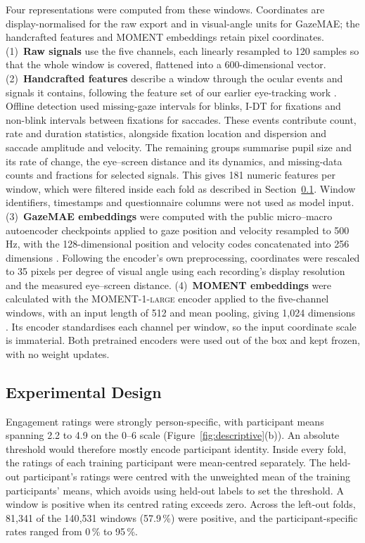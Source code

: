 Four representations were computed from these windows.
Coordinates are display-normalised for the raw export and in visual-angle units for GazeMAE; the handcrafted features and MOMENT embeddings retain pixel coordinates.
(1)~\textbf{Raw signals} use the five channels, each linearly resampled to 120 samples so that the whole window is covered, flattened into a 600-dimensional vector.
(2)~\textbf{Handcrafted features} describe a window through the ocular events and signals it contains, following the feature set of our earlier eye-tracking work \cite{bozak2026workload,bozak2024emotion}.
Offline detection used missing-gaze intervals for blinks, I-DT for fixations and non-blink intervals between fixations for saccades.
These events contribute count, rate and duration statistics, alongside fixation location and dispersion and saccade amplitude and velocity.
The remaining groups summarise pupil size and its rate of change, the eye--screen distance and its dynamics, and missing-data counts and fractions for selected signals.
This gives 181 numeric features per window, which were filtered inside each fold as described in Section~\ref{subsec:design}.
Window identifiers, timestamps and questionnaire columns were not used as model input.
(3)~\textbf{GazeMAE embeddings} were computed with the public micro--macro autoencoder checkpoints applied to gaze position and velocity resampled to 500\,Hz, with the 128-dimensional position and velocity codes concatenated into 256 dimensions \cite{bautista2020gazemae}.
Following the encoder's own preprocessing, coordinates were rescaled to 35 pixels per degree of visual angle using each recording's display resolution and the measured eye--screen distance.
(4)~\textbf{MOMENT embeddings} were calculated with the \textsc{MOMENT-1-large} encoder applied to the five-channel windows, with an input length of 512 and mean pooling, giving 1{,}024 dimensions \cite{goswami2024moment}.
Its encoder standardises each channel per window, so the input coordinate scale is immaterial.
Both pretrained encoders were used out of the box and kept frozen, with no weight updates.

\subsection{Experimental Design}
\label{subsec:design}

Engagement ratings were strongly person-specific, with participant means spanning 2.2 to 4.9 on the 0--6 scale (Figure~\ref{fig:descriptive}(b)).
An absolute threshold would therefore mostly encode participant identity.
Inside every fold, the ratings of each training participant were mean-centred separately.
The held-out participant's ratings were centred with the unweighted mean of the training participants' means, which avoids using held-out labels to set the threshold.
A window is positive when its centred rating exceeds zero.
Across the left-out folds, 81{,}341 of the 140{,}531 windows (57.9\,\%) were positive, and the participant-specific rates ranged from 0\,\% to 95\,\%.

